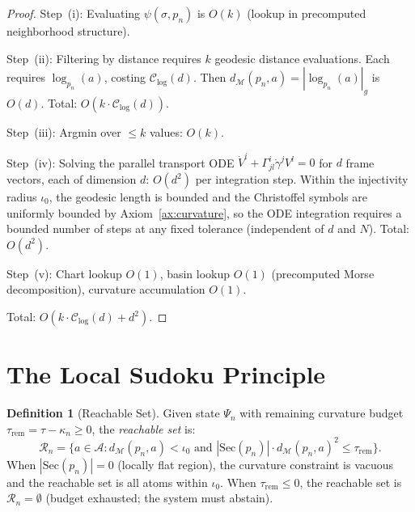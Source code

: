 \documentclass[11pt,a4paper]{article}
\theoremstyle{definition}
\newtheorem{definition}[theorem]{Definition}
\theoremstyle{remark}
\newcommand{\Sec}{\mathrm{Sec}}
\begin{document}
\begin{proof}
Step~(i): Evaluating $\psi(\sigma, p_n)$ is $O(k)$ (lookup in 
precomputed neighborhood structure).

Step~(ii): Filtering by distance requires $k$ geodesic distance 
evaluations. Each requires $\log_{p_n}(a)$, costing 
$\mathcal{C}_{\log}(d)$. Then 
$d_{\mathcal{M}}(p_n, a) = |\log_{p_n}(a)|_g$ is $O(d)$. 
Total: $O(k \cdot \mathcal{C}_{\log}(d))$.

Step~(iii): Argmin over $\leq k$ values: $O(k)$.

Step~(iv): Solving the parallel transport ODE 
$\dot{V}^i + \Gamma^i_{jl}\dot\gamma^j V^l = 0$ for $d$ frame 
vectors, each of dimension $d$: $O(d^2)$ per integration step. 
Within the injectivity radius $\iota_0$, the geodesic length is 
bounded and the Christoffel symbols are uniformly bounded by 
Axiom~\ref{ax:curvature}, so the ODE integration requires a 
bounded number of steps at any fixed tolerance (independent of 
$d$ and $N$). Total: $O(d^2)$.

Step~(v): Chart lookup $O(1)$, basin lookup $O(1)$ (precomputed 
Morse decomposition), curvature accumulation $O(1)$.

Total: $O(k \cdot \mathcal{C}_{\log}(d) + d^2)$.
\end{proof}


\section{The Local Sudoku Principle}\label{sec:sudoku}


\begin{definition}[Reachable Set]\label{def:reachable}
Given state $\Psi_n$ with remaining curvature budget 
$\tau_{\mathrm{rem}} = \tau - \kappa_n \geq 0$, the 
\emph{reachable set} is:
\begin{equation}\label{eq:reachable}
    \mathcal{R}_n = \{a \in \mathcal{A} : 
    d_{\mathcal{M}}(p_n, a) < \iota_0 \text{ and }
    |\Sec(p_n)| \cdot d_{\mathcal{M}}(p_n, a)^2 
    \leq \tau_{\mathrm{rem}}\}.
\end{equation}
When $|\Sec(p_n)| = 0$ (locally flat region), the curvature 
constraint is vacuous and the reachable set is all atoms 
within $\iota_0$. When $\tau_{\mathrm{rem}} \leq 0$, the 
reachable set is $\mathcal{R}_n = \emptyset$ (budget exhausted; 
the system must abstain).
\end{definition}
\end{document}
